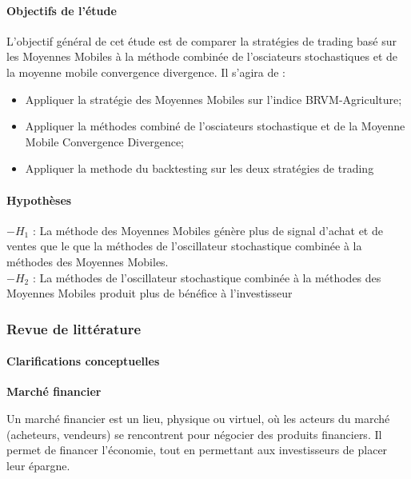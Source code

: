\paragraph{Objectifs de l'étude}\label{objectifs-de-luxe9tude}

L'objectif général de cet étude est de comparer la stratégies de trading
basé sur les Moyennes Mobiles à la méthode combinée de l'osciateurs
stochastiques et de la moyenne mobile convergence divergence. Il s'agira
de :

\begin{itemize}
\item
  {Appliquer la stratégie des Moyennes Mobiles sur l'indice
  BRVM-Agriculture;}
\item
  {Appliquer la méthodes combiné de l'osciateurs stochastique et de la
  Moyenne Mobile Convergence Divergence;}
\item
  {Appliquer la methode du backtesting sur les deux stratégies de
  trading}
\end{itemize}

\paragraph{Hypothèses}\label{hypothuxe8ses}

\(-H_1\){ : La méthode des Moyennes Mobiles génère plus de signal
d'achat et de ventes que le que la méthodes de l'oscillateur
stochastique combinée à la méthodes des Moyennes Mobiles. }\\
\(-H_2\){ : La méthodes de l'oscillateur stochastique combinée à la
méthodes des Moyennes Mobiles produit plus de bénéfice à l'investisseur
}\\

\subsubsection{Revue de littérature}\label{revue-de-littuxe9rature}

\paragraph{Clarifications
conceptuelles}\label{clarifications-conceptuelles}

\textbf{Marché financier}

Un marché financier est un lieu, physique ou virtuel, où les acteurs du
marché (acheteurs, vendeurs) se rencontrent pour négocier des produits
financiers. Il permet de financer l'économie, tout en permettant aux
investisseurs de placer leur épargne.

